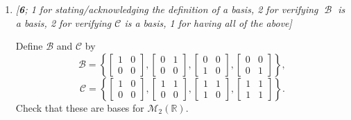\documentclass{amsart}
\theoremstyle{definition}
\theoremstyle{definition}
\newtheorem*{solution}{Solution}
\DeclareMathOperator{\R}{\mathbb{R}}
\DeclareMathOperator{\1}{\mathbbm{1}}
\DeclareMathOperator{\MM}{\mathcal{M}}
\DeclareMathOperator{\B}{\mathcal{B}}
\newcommand{\Tau}{\mathcal{T}}
\begin{document}
\begin{enumerate}[itemsep = 2mm]
\begin{enumerate}[label=\arabic*.]
			Let $\mathcal{T}:\mathcal{M}_2(\mathbb{R})\to \mathcal{M}_2(\mathbb{R})$ be defined by $\mathcal{T}(A)=A^T$. Check that this map is a linear transformation (in the diagram above $T=\mathcal{T}$).
			
			\begin{solution}
				\begin{proof}
					We use the notation $\Tau$ throughout. For all $A,B \in \MM_{2}(\R)$ and $c \in \R$, using the fact that $\MM_{2}(\R)$ is indeed a vector space, we have
					\begin{align*}
						\Tau(A+B) &= (A+B)^\intercal = A^\intercal + B^\intercal = \Tau(A) + \Tau(B) \\
						\Tau(cA) &= (cA)^\intercal = cA^\intercal = c\Tau(A)
					\end{align*}
					as desired.
				\end{proof}
			\end{solution}
			
			\item \textit{[\textbf{6}; 1 for stating/acknowledging the definition of a basis, 2 for verifying $\B$ is a basis, 2 for verifying $\mathcal{C}$ is a basis, 1 for having all of the above]}
			
			Define $\mathcal{B}$ and $\mathcal{C}$ by
			\begin{equation*}
			\mathcal{B}=\left\{
			\begin{bmatrix}
			1&0\\
			0&0
			\end{bmatrix},
			\begin{bmatrix}
			0&1\\
			0&0
			\end{bmatrix},
			\begin{bmatrix}
			0&0\\
			1&0
			\end{bmatrix},
			\begin{bmatrix}
			0&0\\
			0&1
			\end{bmatrix}\right\},
			\end{equation*}
			\begin{equation*}
			\mathcal{C}=\left\{
			\begin{bmatrix}
			1&0\\
			0&0
			\end{bmatrix},
			\begin{bmatrix}
			1&1\\
			0&0
			\end{bmatrix},
			\begin{bmatrix}
			1&1\\
			1&0
			\end{bmatrix},
			\begin{bmatrix}
			1&1\\
			1&1
			\end{bmatrix}\right\}.
			\end{equation*}
			Check that these are bases for $\mathcal{M}_2(\mathbb{R})$. 
			

\end{enumerate}
\end{enumerate}
\end{document}
